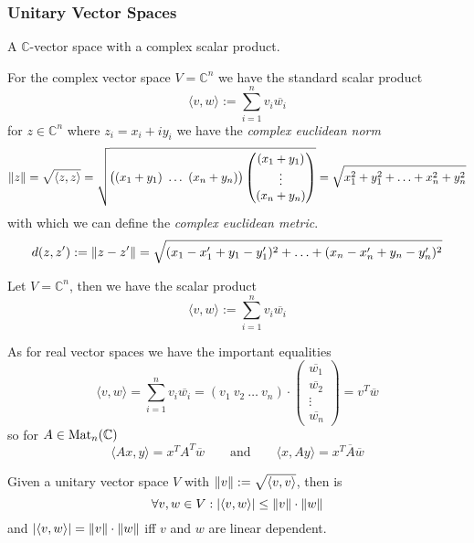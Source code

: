 \subsubsection{Unitary Vector Spaces}
\begin{definition}
   A \(\mathbb{C}\)-vector space with a complex scalar product.
\end{definition}
\begin{example}
   For the complex vector space \(V = \mathbb{C}^n\) we have the standard scalar product
   \[\langle v, w \rangle := \sum_{i=1}^n v_i \overline{w_i}\]
   for \(z \in \mathbb{C}^n\) where \(z_i = x_i + iy_i\) we have the \emph{complex euclidean norm}
   \[\left\lVert z\right\rVert = \sqrt{\langle z, z\rangle} = \sqrt{\big((x_1 + y_1)~\ldots~(x_n + y_n)\big) \begin{pmatrix}(x_1 + y_1)\\\vdots\\(x_n + y_n)\end{pmatrix}} = \sqrt{x_1^2 + y_1^2 + \ldots + x_n^2 + y_n^2}\]
   with which we can define the \emph{complex euclidean metric}.
   \[d(z, z') := \left\lVert z - z'\right\rVert = \sqrt{(x_1 - x_1' + y_1-y_1')^2 + \ldots + (x_n - x_n' + y_n-y_n')^2}\]
\end{example}

\begin{definition}\label{def:compl_scal_prod}
   Let \(V = \mathbb{C}^n\), then we have the scalar product
   \[\langle v, w \rangle := \sum_{i=1}^n v_i \overline{w_i}\]
\end{definition}
\begin{remark}
   As for real vector spaces we have the important equalities
   \[\langle v, w\rangle = \sum_{i=1}^n v_i \overline{w_i} = (v_1~v_2~\ldots~v_n) \cdot \begin{pmatrix}\overline{w_1}\\\overline{w_2}\\\vdots\\\overline{w_n}\end{pmatrix} = v^T\overline{w}\]
   so for \(A \in \operatorname{Mat}_n(\mathbb{C})\)
   \[\langle Ax, y\rangle = x^TA^T\overline{w} \qquad\text{and}\qquad \langle x, Ay \rangle = x^T\overline{A}\overline{w}\]
\end{remark}

\begin{proposition}
   Given a unitary vector space \(V\) with \(\left\lVert v\right\rVert := \sqrt{\langle v, v\rangle}\), then is
   \[\forall v, w \in V: \left\lvert\langle v, w\rangle\right\rvert \leq \left\lVert v\right\rVert \cdot \left\lVert w\right\rVert\]
   and \(|\langle v, w\rangle| = \left\lVert v\right\rVert \cdot \left\lVert w\right\rVert\) iff \(v\) and \(w\) are linear dependent.
\end{proposition}

